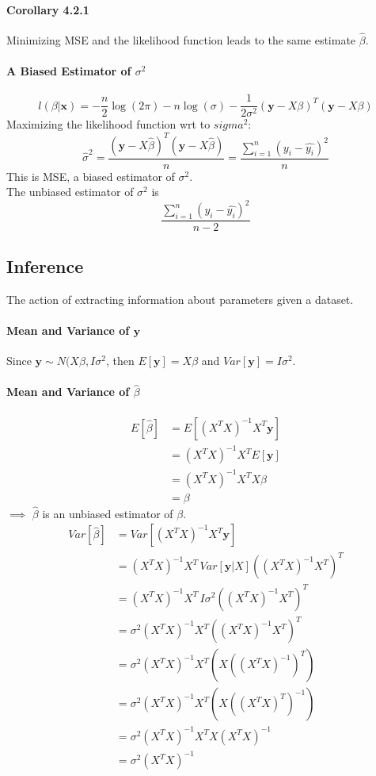 \documentclass[11pt]{article}
\newcommand{\tb}[1]{\textbf{#1}}
\newcommand{\vx}[0]{\tb{x}}
\newcommand{\vy}[0]{\tb{y}}
\begin{document}
\paragraph{Corollary 4.2.1}
Minimizing MSE and the likelihood function leads to the same estimate $\hat{\beta}$.
\paragraph{A Biased Estimator of $\sigma^2$}
$$l(\beta | \vx) = -\frac{n}{2}\log(2\pi) - n\log(\sigma) - \frac{1}{2\sigma^2} (\vy - X \beta)^T(\vy - X\beta)$$
Maximizing the likelihood function wrt to $sigma^2$:
$${\hat{\sigma}}^2 = \frac{(\vy - X\hat{\beta})^T(\vy-X\hat{\beta})}{n} = \frac{\sum_{i=1}^n(y_i-\hat{y_i})^2}{n}$$
This is MSE, a biased estimator of $\sigma^2$. \\
The unbiased estimator of $\sigma^2$ is $$\frac{\sum_{i=1}^n(y_i-\hat{y_i})^2}{n-2}$$
\subsection{Inference}
The action of extracting information about parameters given a dataset.\\
\paragraph{Mean and Variance of $\vy$}
Since $\vy \sim N(X\beta, I\sigma^2$, then $E[\vy] = X\beta$ and $Var[\vy] = I\sigma^2$.
\paragraph{Mean and Variance of $\hat{\beta}$}
\begin{align*}
    E[\hat{\beta}] &= E[(X^TX)^{-1}X^T\vy]\\
    &= (X^TX)^{-1}X^TE[\vy]\\
    &= (X^TX)^{-1}X^TX\beta \\
    &= \beta
\end{align*}
$\implies$ $\hat{\beta}$ is an unbiased estimator of $\beta$.
\begin{align*}
    Var[\hat{\beta}] &= Var[(X^TX)^{-1}X^T\vy]\\
    &= (X^TX)^{-1}X^T \, Var[\vy|X]((X^TX)^{-1}X^T)^T\\
    &= (X^TX)^{-1}X^T \, I\sigma^2 ((X^TX)^{-1}X^T)^T \\
    &= \sigma^2 (X^TX)^{-1}X^T((X^TX)^{-1}X^T)^T \\
    &= \sigma^2 (X^TX)^{-1}X^T(X((X^TX)^{-1})^T)\\
    &= \sigma^2 (X^TX)^{-1}X^T(X((X^TX)^{T})^{-1})\\
    &= \sigma^2 (X^TX)^{-1}X^TX(X^TX)^{-1}\\
    &= \sigma^2 (X^TX)^{-1}
\end{align*}
\end{document}
